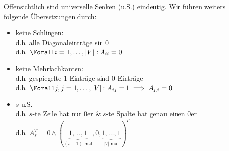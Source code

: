 \begin{solution}

\phantom{}


Offensichtlich sind universelle Senken (u.S.) eindeutig.
Wir führen weiters folgende Übersetzungen durch:

\begin{itemize}

  \item keine Schlingen: \\
  d.h. alle Diagonaleinträge sin $0$ \\
  d.h. $\Forall i = 1, \dots, |V|: A_{ii} = 0$

  \item keine Mehrfachkanten:\\
  d.h. gespiegelte $1$-Einträge sind $0$-Einträge \\
  d.h. $\Forall j, j = 1, \dots, |V|: A_{ij} = 1 \implies A_{j, i} = 0$

  \item $s$ u.S. \\
  d.h. $s$-te Zeile hat nur $0$er \& $s$-te Spalte hat genau einen $0$er \\
  d.h. $A_s^T = 0 \land (\underbrace{1, \dots, 1}_{(s-1) \text{-mal}}, 0, \underbrace{1, \dots, 1}_{|V| \text{-mal}})^T$

\end{itemize}


\end{solution}
